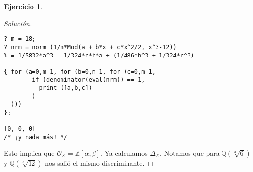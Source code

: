 \documentclass{article}
\newcounter{tarea}
\theoremstyle{definition}
\newtheorem{ejercicio}{Ejercicio}[tarea]
\newenvironment{solucion}{\begin{proof}[Solución]}{\end{proof}}
\newcommand{\ZZ}{\mathbb{Z}}
\newcommand{\QQ}{\mathbb{Q}}
\renewcommand{\O}{\mathcal{O}}
\begin{document}
\begin{ejercicio}
\begin{solucion}
    \begin{framed}\small
\begin{verbatim}
? m = 18;
? nrm = norm (1/m*Mod(a + b*x + c*x^2/2, x^3-12))
% = 1/5832*a^3 - 1/324*c*b*a + (1/486*b^3 + 1/324*c^3)

{ for (a=0,m-1, for (b=0,m-1, for (c=0,m-1,
        if (denominator(eval(nrm)) == 1,
          print ([a,b,c])
        )
  )))
};

[0, 0, 0]
/* ¡y nada más! */
\end{verbatim}
    \end{framed}
    Esto implica que $\O_K = \ZZ [\alpha,\beta]$. Ya calculamos
    $\Delta_K$. Notamos que para $\QQ (\sqrt[3]{6})$ y $\QQ (\sqrt[3]{12})$ nos
    salió el mismo discriminante.
  \end{solucion}
  \fi
\end{ejercicio}
\end{document}
